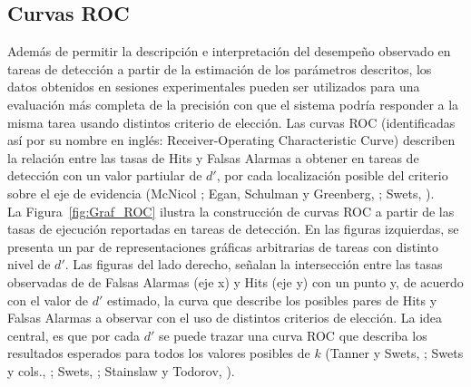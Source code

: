\subsection{Curvas ROC}

Además de permitir la descripción e interpretación del desempeño observado en tareas de detección a partir de la estimación de los parámetros descritos, los datos obtenidos en sesiones experimentales pueden ser utilizados para una evaluación más completa de la precisión con que el sistema podría responder a la misma tarea usando distintos criterio de elección. Las curvas ROC (identificadas así por su nombre en inglés: Receiver-Operating Characteristic Curve) describen la relación entre las tasas de Hits y Falsas Alarmas a obtener en tareas de detección con un valor partiular de $d'$, por cada localización posible del criterio sobre el eje de evidencia (McNicol \citeyear{McNicol2}; Egan, Schulman y Greenberg, \citeyear{Egan1959}; Swets, \citeyear{Swets1973}).\\

La Figura~\ref{fig:Graf_ROC} ilustra la construcción de curvas ROC a partir de las tasas de ejecución reportadas en tareas de detección. En las figuras izquierdas, se presenta un par de representaciones gráficas arbitrarias de tareas con distinto nivel de $d'$. Las figuras del lado derecho, señalan la intersección entre las tasas observadas de de Falsas Alarmas (eje x) y Hits (eje y) con un punto y, de acuerdo con el valor de $d'$ estimado, la curva que describe los posibles pares de Hits y Falsas Alarmas a observar con el uso de distintos criterios de elección. La idea central, es que por cada $d'$ se puede trazar una curva ROC que describa los resultados esperados para todos los valores posibles de $k$ (Tanner y Swets, \citeyear{Tanner1954}; Swets y cols.,  \citeyear{Swets1961}; Swets, \citeyear{Swets1973}; Stainslaw y Todorov, \citeyear{Stainslaw1999}).\\

